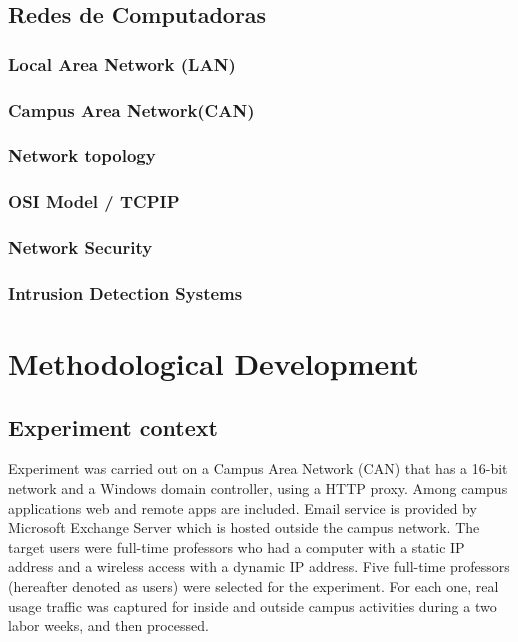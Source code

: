 \documentclass{article}
\begin{document}
\subsection{Redes de Computadoras} %

\subsubsection{Local Area Network (LAN)} %

\subsubsection{Campus Area Network(CAN)} %

\subsubsection{Network topology} %

\subsubsection{OSI Model / TCPIP} %

\subsubsection{Network Security} %

\subsubsection{Intrusion Detection Systems} %






\section{Methodological Development} %


\subsection{Experiment context} %
Experiment was carried out on a Campus Area Network (CAN) that has a 16-bit network and a Windows domain controller, using a HTTP proxy. Among campus applications web and remote apps are included.
Email service is provided by Microsoft Exchange Server which is hosted outside the campus network.
The target users were full-time professors who had a computer with a static IP address and a wireless access with a dynamic IP address.
Five full-time professors (hereafter denoted as users) were selected for the experiment. For each one, real usage traffic was captured for inside and outside campus activities during a two labor weeks, and then processed.
\end{document}
